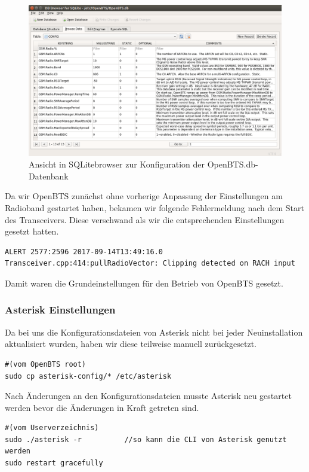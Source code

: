 \begin{figure}[htbp]
	\centering
		\includegraphics[width=1.0\textwidth]{includes/DB_OpenBts_GSMRadio}
	\caption{Ansicht in SQLitebrowser zur Konfiguration der OpenBTS.db-Datenbank}
	\label{fig:sqlitebrowser}
\end{figure}

Da wir OpenBTS zunächst ohne vorherige Anpassung der Einstellungen am Radioband gestartet haben, bekamen wir folgende Fehlermeldung nach dem Start des Transceivers. Diese verschwand als wir die entsprechenden Einstellungen gesetzt hatten.
\begin{lstlisting}
ALERT 2577:2596 2017-09-14T13:49:16.0 Transceiver.cpp:414:pullRadioVector: Clipping detected on RACH input
\end{lstlisting}

Damit waren die Grundeinstellungen für den Betrieb von OpenBTS gesetzt.

\subsubsection{Asterisk Einstellungen}
Da bei uns die Konfigurationsdateien von Asterisk nicht bei jeder Neuinstallation aktualisiert wurden, haben wir diese teilweise manuell zurückgesetzt.
\begin{lstlisting}
#(vom OpenBTS root)
sudo cp asterisk-config/* /etc/asterisk
\end{lstlisting}

Nach Änderungen an den Konfigurationsdateien musste Asterisk neu gestartet werden bevor die Änderungen in Kraft getreten sind.
\begin{lstlisting}
#(vom Userverzeichnis)
sudo ./asterisk -r			//so kann die CLI von Asterisk genutzt werden
sudo restart gracefully
\end{lstlisting}


